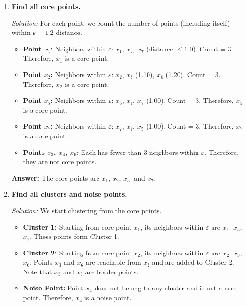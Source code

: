 \documentclass{article}
\begin{document}
\begin{enumerate}[label=(\roman*)]
    \item \textbf{Find all core points.}

    \textit{Solution:} For each point, we count the number of points (including itself) within $\varepsilon = 1.2$ distance.

    \begin{itemize}
        \item \textbf{Point $x_1$:} Neighbors within $\varepsilon$: $x_1$, $x_5$, $x_7$ (distance $\leq 1.0$). Count = 3. Therefore, $x_1$ is a core point.
        \item \textbf{Point $x_2$:} Neighbors within $\varepsilon$: $x_2$, $x_3$ (1.10), $x_6$ (1.20). Count = 3. Therefore, $x_2$ is a core point.
        \item \textbf{Point $x_5$:} Neighbors within $\varepsilon$: $x_5$, $x_1$, $x_7$ (1.00). Count = 3. Therefore, $x_5$ is a core point.
        \item \textbf{Point $x_7$:} Neighbors within $\varepsilon$: $x_7$, $x_1$, $x_5$ (1.00). Count = 3. Therefore, $x_7$ is a core point.
        \item \textbf{Points $x_3$, $x_4$, $x_6$:} Each has fewer than 3 neighbors within $\varepsilon$. Therefore, they are not core points.
    \end{itemize}

    \textbf{Answer:} The core points are $x_1$, $x_2$, $x_5$, and $x_7$.

    \item \textbf{Find all clusters and noise points.}

    \textit{Solution:} We start clustering from the core points.

    \begin{itemize}
        \item \textbf{Cluster 1:} Starting from core point $x_1$, its neighbors within $\varepsilon$ are $x_1$, $x_5$, $x_7$. These points form Cluster 1.
        \item \textbf{Cluster 2:} Starting from core point $x_2$, its neighbors within $\varepsilon$ are $x_2$, $x_3$, $x_6$. Points $x_3$ and $x_6$ are reachable from $x_2$ and are added to Cluster 2. Note that $x_3$ and $x_6$ are border points.
        \item \textbf{Noise Point:} Point $x_4$ does not belong to any cluster and is not a core point. Therefore, $x_4$ is a noise point.
    \end{itemize}

\end{enumerate}
\end{document}
